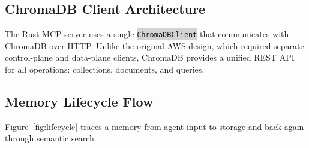 \documentclass[11pt,letterpaper]{article}
\newcommand{\code}[1]{\texttt{\small\colorbox{lightgray}{#1}}}
\begin{document}
\subsection{ChromaDB Client Architecture}

\begin{infobox}
The Rust MCP server uses a single \code{ChromaDBClient} that communicates with ChromaDB over HTTP. Unlike the original AWS design, which required separate control-plane and data-plane clients, ChromaDB provides a unified REST API for all operations: collections, documents, and queries.
\end{infobox}

\subsection{Memory Lifecycle Flow}

Figure~\ref{fig:lifecycle} traces a memory from agent input to storage and back again through semantic search.
\end{document}
